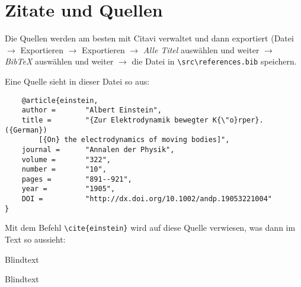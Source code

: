 \cleardoublepage
\chapter{Zitate und Quellen}

Die Quellen werden am besten mit Citavi verwaltet und dann exportiert (Datei $\rightarrow$ Exportieren $\rightarrow$ Exportieren $\rightarrow$ \textit{Alle Titel} auswählen und weiter $\rightarrow$ \textit{BibTeX} auswählen und weiter $\rightarrow$ die Datei in \verb+\src\references.bib+ speichern.

Eine Quelle sieht in dieser Datei so aus:\\
\begin{verbatim}
    @article{einstein,
    author =       "Albert Einstein",
    title =        "{Zur Elektrodynamik bewegter K{\"o}rper}. ({German})
        [{On} the electrodynamics of moving bodies]",
    journal =      "Annalen der Physik",
    volume =       "322",
    number =       "10",
    pages =        "891--921",
    year =         "1905",
    DOI =          "http://dx.doi.org/10.1002/andp.19053221004"
}
\end{verbatim}

Mit dem Befehl \verb+\cite{einstein}+ wird auf diese Quelle verwiesen, was dann im Text so aussieht: \cite{einstein} \cite{latexcompanion} \cite{knuthwebsite} \cite{adams1995hitchhiker} \cite{WinNT} \cite{.912Nov.1997} \cite{.2126May2001} \cite{.14.07.200917.07.2009} \cite{.08.08.200911.08.2009}\bigskip



Blindtext \cite{.09.08.200912.08.2009} \cite{.11.06.201714.06.2017} \cite{Amodio.11.06.201714.06.2017} \cite{Arioui.14.07.200917.07.2009} \cite{Ariouiaspoidjasdlkj}



Blindtext \cite{Bruschetta.2018} \cite{Bruschetta.2017} \cite{Ni.09.08.200912.08.2009} \cite{Park.2126May2001} \cite{Peng.08.08.200911.08.2009} \cite{Stapleford.912Nov.1997}

